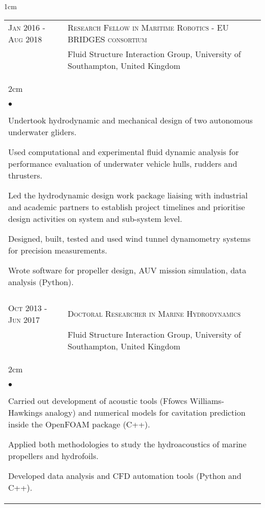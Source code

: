 \documentclass[a4paper,10pt]{article}
\newcommand{\squishlist}{
	\begin{list}{$\bullet$}
	{
		\setlength{\itemsep}{0pt}
		\setlength{\parsep}{0pt}
		\setlength{\topsep}{0pt}
		\setlength{\partopsep}{0pt}
		\setlength{\leftmargin}{2em}
		\setlength{\labelwidth}{1.5em}
		\setlength{\labelsep}{0.5em}
	}
}
\newcommand{\squishend}{\end{list}}
\begin{document}
\begin{minipage}{\textwidth}
\begin{adjustwidth}{}{1cm}
\begin{tabular}{p{3.5cm} p{12.9cm}}
\textsc{Jan 2016 - Aug 2018} & \textsc{Research Fellow in Maritime Robotics - EU BRIDGES consortium} \\
							& Fluid Structure Interaction Group, University of Southampton, United Kingdom \vspace{0.1cm} \\
%
\multicolumn{2}{l}{
\hspace{1cm}\begin{minipage}[t]{\textwidth}
\begin{adjustwidth}{}{2cm}
\squishlist
	\item Undertook hydrodynamic and mechanical design of two autonomous underwater gliders.
	\item Used computational and experimental fluid dynamic analysis for performance evaluation of underwater vehicle hulls, rudders and thrusters.
	\item Led the hydrodynamic design work package liaising with industrial and academic partners to establish project timelines and prioritise design activities on system and sub-system level.
	\item Designed, built, tested and used wind tunnel dynamometry systems for precision measurements.
	\item Wrote software for propeller design, AUV mission simulation, data analysis (Python).
\squishend
\end{adjustwidth}
\end{minipage}
} \\
\\

\textsc{Oct 2013 - Jun 2017} & \textsc{Doctoral Researcher in Marine Hydrodynamics} \\%
							& Fluid Structure Interaction Group, University of Southampton, United Kingdom \vspace{0.1cm} \\
%
\multicolumn{2}{l}{
\hspace{1cm}\begin{minipage}[t]{\textwidth}
\begin{adjustwidth}{}{2cm}
\squishlist
	\item Carried out development of acoustic tools (Ffowcs Williams-Hawkings analogy) and numerical models for cavitation prediction inside the OpenFOAM package (C++).
	\item Applied both methodologies to study the hydroacoustics of marine propellers and hydrofoils.
	\item Developed data analysis and CFD automation tools (Python and C++).
\squishend
\end{adjustwidth}
\end{minipage}
} \\


\end{tabular}
\end{adjustwidth}
\end{minipage}
\end{document}
